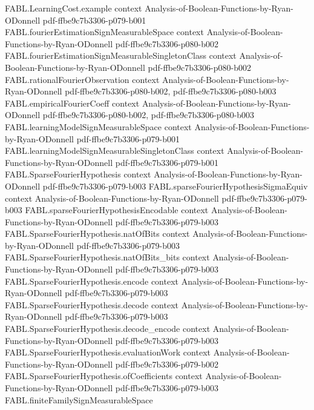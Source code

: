 \begin{theorem}
\proofstep
  {FABL.LearningCost.example}
  {context}
  {Analysis-of-Boolean-Functions-by-Ryan-ODonnell}
  {pdf-ffbe9c7b3306-p079-b001}
\proofstep
  {FABL.fourierEstimationSignMeasurableSpace}
  {context}
  {Analysis-of-Boolean-Functions-by-Ryan-ODonnell}
  {pdf-ffbe9c7b3306-p080-b002}
\proofstep
  {FABL.fourierEstimationSignMeasurableSingletonClass}
  {context}
  {Analysis-of-Boolean-Functions-by-Ryan-ODonnell}
  {pdf-ffbe9c7b3306-p080-b002}
\proofstep
  {FABL.rationalFourierObservation}
  {context}
  {Analysis-of-Boolean-Functions-by-Ryan-ODonnell}
  {pdf-ffbe9c7b3306-p080-b002,
    pdf-ffbe9c7b3306-p080-b003}
\proofstep
  {FABL.empiricalFourierCoeff}
  {context}
  {Analysis-of-Boolean-Functions-by-Ryan-ODonnell}
  {pdf-ffbe9c7b3306-p080-b002,
    pdf-ffbe9c7b3306-p080-b003}
\proofstep
  {FABL.learningModelSignMeasurableSpace}
  {context}
  {Analysis-of-Boolean-Functions-by-Ryan-ODonnell}
  {pdf-ffbe9c7b3306-p079-b001}
\proofstep
  {FABL.learningModelSignMeasurableSingletonClass}
  {context}
  {Analysis-of-Boolean-Functions-by-Ryan-ODonnell}
  {pdf-ffbe9c7b3306-p079-b001}
\proofstep
  {FABL.SparseFourierHypothesis}
  {context}
  {Analysis-of-Boolean-Functions-by-Ryan-ODonnell}
  {pdf-ffbe9c7b3306-p079-b003}
\proofstep
  {FABL.sparseFourierHypothesisSigmaEquiv}
  {context}
  {Analysis-of-Boolean-Functions-by-Ryan-ODonnell}
  {pdf-ffbe9c7b3306-p079-b003}
\proofstep
  {FABL.sparseFourierHypothesisEncodable}
  {context}
  {Analysis-of-Boolean-Functions-by-Ryan-ODonnell}
  {pdf-ffbe9c7b3306-p079-b003}
\proofstep
  {FABL.SparseFourierHypothesis.natOfBits}
  {context}
  {Analysis-of-Boolean-Functions-by-Ryan-ODonnell}
  {pdf-ffbe9c7b3306-p079-b003}
\proofstep
  {FABL.SparseFourierHypothesis.natOfBits_bits}
  {context}
  {Analysis-of-Boolean-Functions-by-Ryan-ODonnell}
  {pdf-ffbe9c7b3306-p079-b003}
\proofstep
  {FABL.SparseFourierHypothesis.encode}
  {context}
  {Analysis-of-Boolean-Functions-by-Ryan-ODonnell}
  {pdf-ffbe9c7b3306-p079-b003}
\proofstep
  {FABL.SparseFourierHypothesis.decode}
  {context}
  {Analysis-of-Boolean-Functions-by-Ryan-ODonnell}
  {pdf-ffbe9c7b3306-p079-b003}
\proofstep
  {FABL.SparseFourierHypothesis.decode_encode}
  {context}
  {Analysis-of-Boolean-Functions-by-Ryan-ODonnell}
  {pdf-ffbe9c7b3306-p079-b003}
\proofstep
  {FABL.SparseFourierHypothesis.evaluationWork}
  {context}
  {Analysis-of-Boolean-Functions-by-Ryan-ODonnell}
  {pdf-ffbe9c7b3306-p079-b002}
\proofstep
  {FABL.SparseFourierHypothesis.ofCoefficients}
  {context}
  {Analysis-of-Boolean-Functions-by-Ryan-ODonnell}
  {pdf-ffbe9c7b3306-p079-b003}
\proofstep
  {FABL.finiteFamilySignMeasurableSpace}

\end{theorem}
